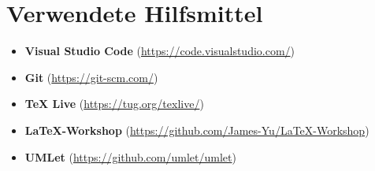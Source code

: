 
\section*{Verwendete Hilfsmittel}

\begin{itemize}
    \item \textbf{Visual Studio Code} (\url{https://code.visualstudio.com/})
    \item \textbf{Git} (\url{https://git-scm.com/})
    \item \textbf{TeX Live} (\url{https://tug.org/texlive/})
    \item \textbf{LaTeX-Workshop} (\url{https://github.com/James-Yu/LaTeX-Workshop})
    \item \textbf{UMLet} (\url{https://github.com/umlet/umlet})
\end{itemize}